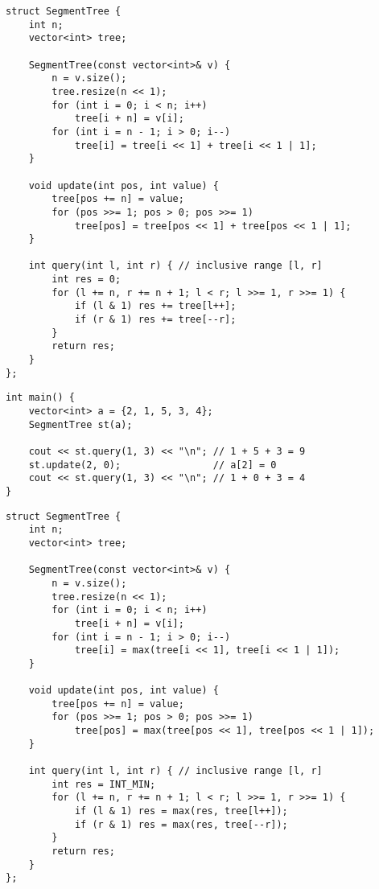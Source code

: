 \documentclass[11pt,a4paper]{article}
\begin{document}
\begin{lstlisting}[caption={Segment Tree for Range Sum}]
struct SegmentTree {
    int n;
    vector<int> tree;

    SegmentTree(const vector<int>& v) {
        n = v.size();
        tree.resize(n << 1);
        for (int i = 0; i < n; i++)
            tree[i + n] = v[i];
        for (int i = n - 1; i > 0; i--)
            tree[i] = tree[i << 1] + tree[i << 1 | 1];
    }

    void update(int pos, int value) {
        tree[pos += n] = value;
        for (pos >>= 1; pos > 0; pos >>= 1)
            tree[pos] = tree[pos << 1] + tree[pos << 1 | 1];
    }

    int query(int l, int r) { // inclusive range [l, r]
        int res = 0;
        for (l += n, r += n + 1; l < r; l >>= 1, r >>= 1) {
            if (l & 1) res += tree[l++];
            if (r & 1) res += tree[--r];
        }
        return res;
    }
};
\end{lstlisting}

\begin{lstlisting}[caption={Segment Tree Example Usage}]
int main() {
    vector<int> a = {2, 1, 5, 3, 4};
    SegmentTree st(a);

    cout << st.query(1, 3) << "\n"; // 1 + 5 + 3 = 9
    st.update(2, 0);                // a[2] = 0
    cout << st.query(1, 3) << "\n"; // 1 + 0 + 3 = 4
}
\end{lstlisting}

\newpage
\begin{lstlisting}[caption={Segment Tree for Range Maximum}]
struct SegmentTree {
    int n;
    vector<int> tree;

    SegmentTree(const vector<int>& v) {
        n = v.size();
        tree.resize(n << 1);
        for (int i = 0; i < n; i++)
            tree[i + n] = v[i];
        for (int i = n - 1; i > 0; i--)
            tree[i] = max(tree[i << 1], tree[i << 1 | 1]);
    }

    void update(int pos, int value) {
        tree[pos += n] = value;
        for (pos >>= 1; pos > 0; pos >>= 1)
            tree[pos] = max(tree[pos << 1], tree[pos << 1 | 1]);
    }

    int query(int l, int r) { // inclusive range [l, r]
        int res = INT_MIN;
        for (l += n, r += n + 1; l < r; l >>= 1, r >>= 1) {
            if (l & 1) res = max(res, tree[l++]);
            if (r & 1) res = max(res, tree[--r]);
        }
        return res;
    }
};
\end{lstlisting}
\end{document}
